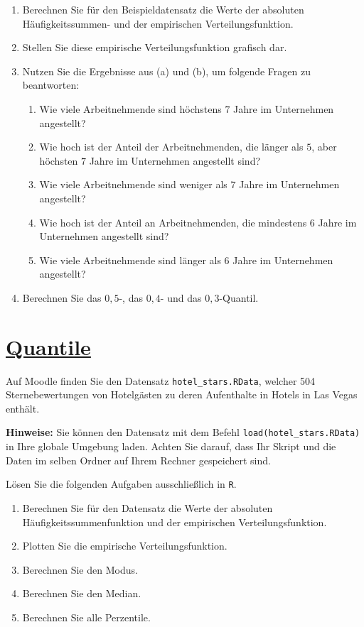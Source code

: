 \documentclass[12pt,a4paper]{article}
\newcommand{\tmpsection}[1]{}
\let\tmpsection=\section
\renewcommand{\section}[1]{\tmpsection{\underline{#1}} }
\begin{document}
\begin{enumerate}[label=(\alph*)]
  \item Berechnen Sie für den Beispieldatensatz die Werte der absoluten Häufigkeitssummen- und der empirischen Verteilungsfunktion. 
  \item Stellen Sie diese empirische Verteilungsfunktion grafisch dar. 
  \item Nutzen Sie die Ergebnisse aus (a) und (b), um folgende Fragen zu beantworten:
  \begin{enumerate}[label=\roman*)]
    \item Wie viele Arbeitnehmende sind höchstens $7$ Jahre im Unternehmen angestellt?
    \item Wie hoch ist der Anteil der Arbeitnehmenden, die länger als $5$, aber höchsten $7$ Jahre im Unternehmen angestellt sind?
    \item Wie viele Arbeitnehmende sind weniger als $7$ Jahre im Unternehmen angestellt?
    \item Wie hoch ist der Anteil an Arbeitnehmenden, die mindestens $6$ Jahre im Unternehmen angestellt sind?
    \item Wie viele Arbeitnehmende sind länger als $6$ Jahre im Unternehmen angestellt?
  \end{enumerate}
  \item Berechnen Sie das $0,5$-, das $0,4$- und das $0,3$-Quantil. 
\end{enumerate}

\hypertarget{quantile}{%
\section{Quantile}\label{quantile}}

Auf Moodle finden Sie den Datensatz \texttt{hotel\_stars.RData}, welcher
504 Sternebewertungen von Hotelgästen zu deren Aufenthalte in Hotels in
Las Vegas enthält.

\textbf{Hinweise:} Sie können den Datensatz mit dem Befehl
\texttt{load(\textquotesingle{}hotel\_stars.RData\textquotesingle{})} in
Ihre globale Umgebung laden. Achten Sie darauf, dass Ihr Skript und die
Daten im selben Ordner auf Ihrem Rechner gespeichert sind.

Lösen Sie die folgenden Aufgaben ausschließlich in \texttt{R}.

\begin{enumerate}[label=(\alph*)]
  \item Berechnen Sie für den Datensatz die Werte der absoluten Häufigkeitssummenfunktion und der empirischen Verteilungsfunktion.
  \item Plotten Sie die empirische Verteilungsfunktion. 
  \item Berechnen Sie den Modus.
  \item Berechnen Sie den Median.
  \item Berechnen Sie alle Perzentile. 
\end{enumerate}
\end{document}
